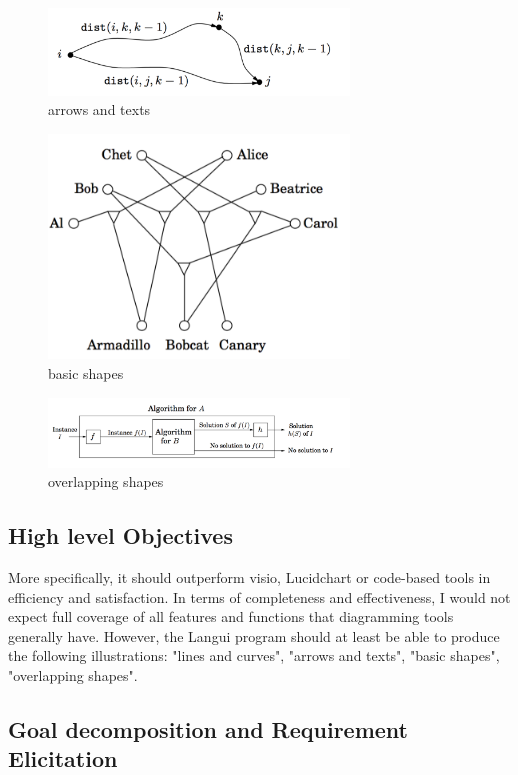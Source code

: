 \documentclass[10pt,conference, twocolumn]{IEEEtran}
\begin{document}
\begin{figure}[H]
\caption{arrows and texts}
\includegraphics[width=8cm]{2.png}
\end{figure}

\begin{figure}[H]
\caption{basic shapes}
\includegraphics[width=8cm]{3.png}
\end{figure}

\begin{figure}[H]
\caption{overlapping shapes}
\includegraphics[width=8cm]{4.png}
\end{figure}
\subsection{High level Objectives}

More specifically, it should outperform visio, Lucidchart or code-based tools in efficiency and satisfaction. In terms of completeness and effectiveness, I would not expect full coverage of all features and functions that diagramming tools generally have. However, the Langui program should at least be able to produce the following illustrations: "lines and curves", "arrows and texts", "basic shapes", "overlapping shapes".



\subsection{Goal decomposition and Requirement Elicitation}
\end{document}

